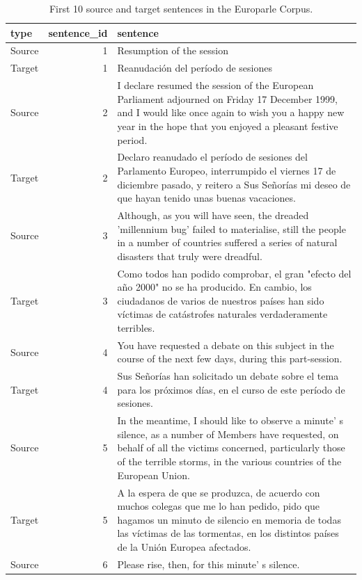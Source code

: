 \documentclass[
  letterpaper,
]{scrbook}
\begin{document}
\hypertarget{tbl-structure-europarle}{}
\begin{table}
\caption{\label{tbl-structure-europarle}First 10 source and target sentences in the Europarle Corpus. }\tabularnewline

\centering
\begin{tabular}{lrl}
\toprule
type & sentence\_id & sentence\\
\midrule
Source & 1 & Resumption of the session\\
Target & 1 & Reanudación del período de sesiones\\
Source & 2 & I declare resumed the session of the European Parliament adjourned on Friday 17 December 1999, and I would like once again to wish you a happy new year in the hope that you enjoyed a pleasant festive period.\\
Target & 2 & Declaro reanudado el período de sesiones del Parlamento Europeo, interrumpido el viernes 17 de diciembre pasado, y reitero a Sus Señorías mi deseo de que hayan tenido unas buenas vacaciones.\\
Source & 3 & Although, as you will have seen, the dreaded 'millennium bug' failed to materialise, still the people in a number of countries suffered a series of natural disasters that truly were dreadful.\\
\addlinespace
Target & 3 & Como todos han podido comprobar, el gran "efecto del año 2000" no se ha producido. En cambio, los ciudadanos de varios de nuestros países han sido víctimas de catástrofes naturales verdaderamente terribles.\\
Source & 4 & You have requested a debate on this subject in the course of the next few days, during this part-session.\\
Target & 4 & Sus Señorías han solicitado un debate sobre el tema para los próximos días, en el curso de este período de sesiones.\\
Source & 5 & In the meantime, I should like to observe a minute' s silence, as a number of Members have requested, on behalf of all the victims concerned, particularly those of the terrible storms, in the various countries of the European Union.\\
Target & 5 & A la espera de que se produzca, de acuerdo con muchos colegas que me lo han pedido, pido que hagamos un minuto de silencio en memoria de todas las víctimas de las tormentas, en los distintos países de la Unión Europea afectados.\\
\addlinespace
Source & 6 & Please rise, then, for this minute' s silence.\\

\end{tabular}
\end{table}
\end{document}
